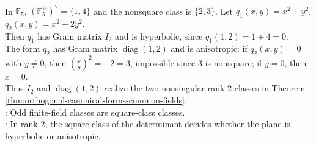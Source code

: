 \begin{example} \label{ex:finite-field-orthogonal-rank-two-classes} \\
In $\mathbb{F}_5$, $(\mathbb{F}_5^{\times})^2=\{1,4\}$ and the nonsquare class is $\{2,3\}$. Let $q_1(x,y)=x^2+y^2$, $q_2(x,y)=x^2+2y^2$.\\
Then $q_1$ has Gram matrix $I_2$ and is hyperbolic, since $q_1(1,2)=1+4=0$.\\
The form $q_2$ has Gram matrix $\operatorname{diag}(1,2)$ and is anisotropic: if $q_2(x,y)=0$ with $y\neq0$, then $\left(\frac{x}{y}\right)^2=-2=3$, impossible since $3$ is nonsquare; if $y=0$, then $x=0$.\\
Thus $I_2$ and $\operatorname{diag}(1,2)$ realize the two nonsingular rank-$2$ classes in Theorem \ref{thm:orthogonal-canonical-forms-common-fields}.\\
: Odd finite-field classes are square-class classes.\\
: In rank $2$, the square class of the determinant decides
whether the plane is hyperbolic or anisotropic.
\end{example}

